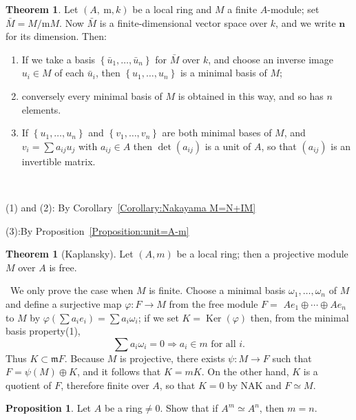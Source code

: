 \documentclass[a4paper,12pt]{article}
\newenvironment{prooff}{{\noindent\it\textcolor{cyan!40!black}{Proof}:}\,}{\par}
\theoremstyle{definition}
\newtheorem{theo}[defn]{Theorem}
\newtheorem{prop}[defn]{Proposition}
\begin{document}
\begin{theo}
    Let $(A, \mathrm{~m}, k)$ be a local ring and $M$ a finite $A$-module; set $\bar{M}=M / \mathrm{m} M$. Now $\bar{M}$ is a finite-dimensional vector space over $k$, and we
    write $\boldsymbol{n}$ for its dimension. Then:
    \begin{enumerate}[(1)]
        \item If we take a basis $\left\{\bar{u}_1, \ldots, \bar{u}_n\right\}$ for $\bar{M}$ over $k$, and choose an inverse image $u_i \in M$ of each $\bar{u}_i$, then $\left\{u_1, \ldots, u_n\right\}$ is a minimal basis of $M$;
        \item conversely every minimal basis of $M$ is obtained in this way, and so has $n$ elements.
        \item If $\left\{u_1, \ldots, u_n\right\}$ and $\left\{v_1, \ldots, v_n\right\}$ are both minimal bases of $M$, and $v_i=\sum a_{i j} u_j$ with $a_{i j} \in A$ then $\operatorname{det}\left(a_{i j}\right)$ is a unit of $A$, so that $\left(a_{i j}\right)$ is an invertible matrix.
    \end{enumerate}
\end{theo}
\begin{prooff}

    (1) and (2): By Corollary~\ref{Corollary:Nakayama M=N+IM}

    (3):By Proposition~\ref{Proposition:unit=A-m}
\end{prooff}
\begin{theo}[Kaplansky]
    Let $(A,m)$ be a local ring; then a projective module $M$ over $A$ is free.
\end{theo}
\begin{prooff}
    We only prove the case when $M$ is finite.
    Choose a minimal basis $\omega_1, \ldots, \omega_n$ of $M$ and define a surjective map $\varphi: F \longrightarrow M$ from the free module $F=$ $A e_1 \oplus \cdots \oplus A e_n$ to $M$ by $\varphi\left(\sum a_i e_i\right)=\sum a_i \omega_i$; if we set $K=\operatorname{Ker}(\varphi)$ then, from
    the minimal basis property(1),
    $$
        \sum a_i \omega_i=0 \Rightarrow a_i \in m \text { for all } i .
    $$
    Thus $K \subset \mathfrak{m} F$. Because $M$ is projective, there exists $\psi: M \longrightarrow F$ such that $F=\psi(M) \oplus K$, and it follows that $K=m K$. On the other hand, $K$ is a quotient of $F$, therefore finite over $A$, so that $K=0$ by NAK and $F \simeq M$.
\end{prooff}
\begin{prop}
    Let $A$ be a ring$\neq 0$. Show that if $A^m\simeq A^n$, then $m=n$.
\end{prop}
\end{document}
